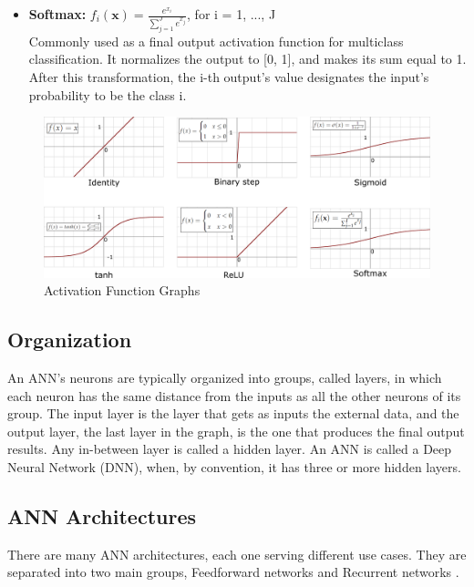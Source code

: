 \begin{itemize}
	\item \textbf{Softmax:} $
		      f_i(\textbf{x}) = \frac{
		      e^{x_i}
		      }{
		      \sum_{j=1}^{J}e^{x_j}
		      }
		  $, for i = 1, ..., J\\
		  Commonly used as a final output activation function for multiclass classification. It normalizes the output to [0, 1], and makes its sum equal to 1. After this transformation, the i-th output's value designates the input's probability to be the class i.
\end{itemize}

\begin{figure} [H]
	\centering
	\includegraphics[width=\textwidth]{../Images/CNNArchitectures/Activation_functions.png}
	\decoRule
	\caption[Activation Function Graphs]{Activation Function Graphs}
	\label{fig:activation-functions}
\end{figure}

\subsection{Organization}
An ANN's neurons are typically organized into groups, called layers, in which each neuron has the same distance from the inputs as all the other neurons of its group. The input layer is the layer that gets as inputs the external data, and the output layer, the last layer in the graph, is the one that produces the final output results. Any in-between layer is called a hidden layer. An ANN is called a Deep Neural Network (DNN), when, by convention, it has three or more hidden layers.

\subsection{ANN Architectures}
There are many ANN architectures, each one serving different use cases. They are separated into two main groups, Feedforward networks and Recurrent networks \cite{Types-of-Artificial-Neural-Networks}.

